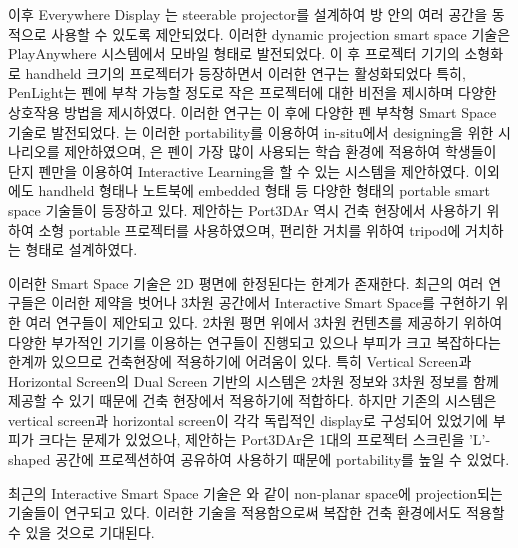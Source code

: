 이후 Everywhere Display\cite{pinhanez_everywhere_2001, pinhanez_creating_2003, sukaviriya_portable_2004} 는 steerable projector를 설계하여 방 안의 여러 공간을 동적으로 사용할 수 있도록 제안되었다. 이러한 dynamic projection smart space 기술은 PlayAnywhere\cite{wilson_playanywhere:_2005} 시스템에서 모바일 형태로 발전되었다. 이 후 프로젝터 기기의 소형화로 handheld 크기의 프로젝터가 등장하면서 이러한 연구는 활성화되었다\cite{cao_interacting_2006, raskar_rfig_2004} 특히, PenLight\cite{song_penlight:_2009}는 펜에 부착 가능할 정도로 작은 프로젝터에 대한 비전을 제시하며 다양한 상호작용 방법을 제시하였다. 이러한 연구는 이 후에 다양한 펜 부착형 Smart Space 기술로 발전되었다. \cite{kim_ar_2013}는 이러한 portability를 이용하여 in-situ에서 designing을 위한 시나리오를 제안하였으며, \cite{kim_ar_2014}은 펜이 가장 많이 사용되는 학습 환경에 적용하여 학생들이 단지 펜만을 이용하여 Interactive Learning을 할 수 있는 시스템을 제안하였다. 이외에도 handheld 형태\cite{huber_lightbeam:_2012, kim_ilight:_2010}나 노트북에 embedded 형태\cite{kane_bonfire:_2009} 등 다양한 형태의 portable smart space 기술들이 등장하고 있다. 제안하는 Port3DAr 역시 건축 현장에서 사용하기 위하여 소형 portable 프로젝터를 사용하였으며, 편리한 거치를 위하여 tripod에 거치하는 형태로 설계하였다.

이러한 Smart Space 기술은 2D 평면에 한정된다는 한계가 존재한다. 최근의 여러 연구들은 이러한 제약을 벗어나 3차원 공간에서 Interactive Smart Space를 구현하기 위한 여러 연구들이 제안되고 있다\cite{grossman__2010}. 2차원 평면 위에서 3차원 컨텐츠를 제공하기 위하여 다양한 부가적인 기기를 이용하는 연구들\textcolor{red}{\cite{}}이 진행되고 있으나 부피가 크고 복잡하다는 한계까 있으므로 건축현장에 적용하기에 어려움이 있다. 특히 Vertical Screen과 Horizontal Screen의 Dual Screen 기반의 시스템\cite{weiss_benddesk:_2010, coram_astrotouch:_2013, wimmer_curve:_2010, benko_miragetable:_2012}은 2차원 정보와 3차원 정보를 함께 제공할 수 있기 때문에 건축 현장에서 적용하기에 적합하다. 하지만 기존의 시스템은 vertical screen과 horizontal screen이 각각 독립적인 display로 구성되어 있었기에 부피가 크다는 문제가 있었으나, 제안하는 Port3DAr은 1대의 프로젝터 스크린을 'L'-shaped 공간에 프로젝션하여 공유하여 사용하기 때문에 portability를 높일 수 있었다.

최근의 Interactive Smart Space 기술은 \cite{jones_illumiroom:_2013, steimle_flexpad:_2013}와 같이 non-planar space에 projection되는 기술들이 연구되고 있다. 이러한 기술을 적용함으로써 복잡한 건축 환경에서도 적용할 수 있을 것으로 기대된다. 

